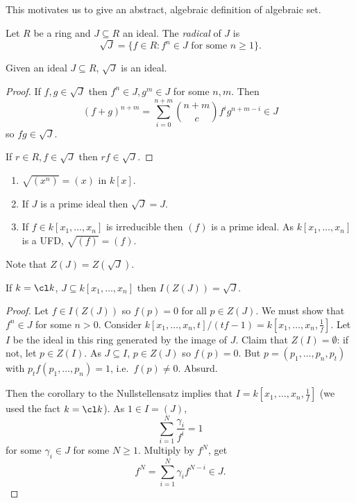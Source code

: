 \documentclass[a4paper]{article}
\begin{document}
This motivates us to give an abstract, algebraic definition of algebraic set.

\begin{definition}[radical]
  Let \(R\) be a ring and \(J \subseteq R\) an ideal. The \emph{radical} of \(J\) is
  \[
    \sqrt J = \{f \in R: f^n \in J \text{ for some } n \geq 1\}.
  \]
\end{definition}

\begin{lemma}
  Given an ideal \(J \subseteq R\), \(\sqrt J\) is an ideal.
\end{lemma}

\begin{proof}
  If \(f, g \in \sqrt J\) then \(f^n \in J, g^m \in J\) for some \(n, m\). Then
  \[
    (f + g)^{n + m} = \sum_{i = 0}^{n + m} \binom{n + m}{c} f^i g^{n + m - i} \in J
  \]
  so \(fg \in \sqrt J\).

  If \(r \in R, f \in \sqrt J\) then \(rf \in \sqrt J\).
\end{proof}

\begin{eg}\leavevmode
  \begin{enumerate}
  \item \(\sqrt{(x^n)} = (x)\) in \(k[x]\).
  \item If \(J\) is a prime ideal then \(\sqrt J = J\).
  \item If \(f \in k[x_1, \dots, x_n]\) is irreducible then \((f)\) is a prime ideal. As \(k[x_1, \dots, x_n]\) is a UFD, \(\sqrt{(f)} = (f)\).
  \end{enumerate}
\end{eg}

Note that \(Z(J) = Z(\sqrt J)\).

\begin{theorem}[Nullstellensatz]
  If \(k = \cl k\), \(J \subseteq k[x_1, \dots, x_n]\) then \(I(Z(J)) = \sqrt J\).
\end{theorem}

\begin{proof}
  Let \(f \in I(Z(J))\) so \(f(p) = 0\) for all \(p \in Z(J)\). We must show that \(f^n \in J\) for some \(n > 0\). Consider \(k[x_1, \dots, x_n, t]/(tf - 1) = k[x_1, \dots, x_n, \frac{1}{f}]\). Let \(I\) be the ideal in this ring generated by the image of \(J\). Claim that \(Z(I) = \emptyset\): if not, let \(p \in Z(I)\). As \(J \subseteq I\), \(p \in Z(J)\) so \(f(p) = 0\). But \(p = (p_1, \dots, p_n, p_t)\) with \(p_t f(p_1, \dots, p_n) = 1\), i.e.\ \(f(p) \neq 0\). Absurd.

  Then the corollary to the Nullstellensatz implies that \(I = k[x_1, \dots, x_n, \frac{1}{f}]\) (we used the fact \(k = \cl k\)). As \(1 \in I = (J)\),
  \[
    \sum_{i = 1}^N \frac{\gamma_i}{f^i} = 1
  \]
  for some \(\gamma_i \in J\) for some \(N \geq 1\). Multiply by \(f^N\), get
  \[
    f^N = \sum_{i = 1}^N \gamma_i f^{N -i} \in J.
  \]
\end{proof}
\end{document}
